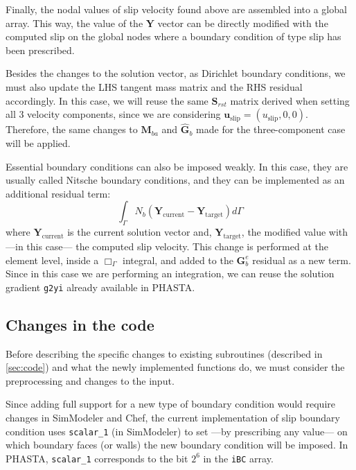 \documentclass{ucb}
\begin{document}
Finally, the nodal values of slip velocity found above are assembled into a global array. This way, the value of the $\bm{Y}$ vector can be directly modified with the computed slip on the global nodes where a boundary condition of type slip has been prescribed.

Besides the changes to the solution vector, as Dirichlet boundary conditions, we must also update the LHS tangent mass matrix and the RHS residual accordingly. In this case, we will reuse the same $\bm{S}_{rst}$ matrix derived when setting all 3 velocity components, since we are considering $\bm{u}_\mathrm{slip} = \left(u_\mathrm{slip}, 0, 0\right)$. Therefore, the same changes to $\bm{M}_{ba}$ and $\bm{\hat{G}}_b$ made for the three-component case will be applied.

Essential boundary conditions can also be imposed weakly. In this case, they are usually called Nitsche boundary conditions, and they can be implemented as an additional residual term:
\begin{equation}
    \int_\Gamma N_b \left(\bm{Y}_\mathrm{current} - \bm{Y}_\mathrm{target}\right) d\Gamma
    \label{eq:nitsche}
\end{equation}
where $\bm{Y}_\mathrm{current}$ is the current solution vector and, $\bm{Y}_\mathrm{target}$, the modified value with ---in this case--- the computed slip velocity. This change is performed at the element level, inside a $\Box_\Gamma$ integral, and added to the $\bm{G}_b^e$ residual as a new term. Since in this case we are performing an integration, we can reuse the solution gradient \texttt{g2yi} already available in PHASTA.

\subsection{Changes in the code}

Before describing the specific changes to existing subroutines (described in \autoref{sec:code}) and what the newly implemented functions do, we must consider the preprocessing and changes to the input.

Since adding full support for a new type of boundary condition would require changes in SimModeler and Chef, the current implementation of slip boundary condition uses \texttt{scalar\_1} (in SimModeler) to set ---by prescribing any value--- on which boundary faces (or walls) the new boundary condition will be imposed. In PHASTA, \texttt{scalar\_1} corresponds to the bit $2^6$ in the \texttt{iBC} array.
\end{document}
